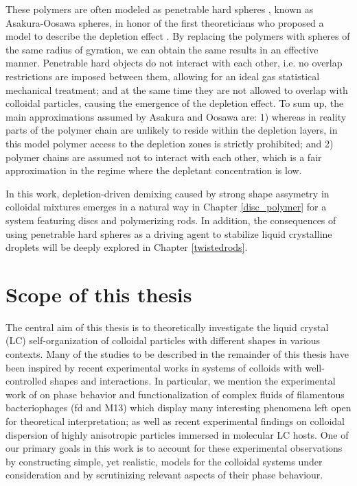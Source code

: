 These polymers are often modeled as penetrable hard spheres \cite{GARCIA201816}, known as Asakura-Oosawa spheres, in honor of the first theoreticians who proposed a model to describe the depletion effect \cite{ASAKURA54,ASAKURA58,Vrijdepletie}. By replacing the polymers with spheres of the same radius of gyration, we can obtain the same results in an effective manner. Penetrable hard objects do not interact with each other, i.e. no overlap restrictions are imposed between them, allowing for an ideal gas statistical mechanical treatment; and at the same time they are not allowed to overlap with colloidal particles, causing the emergence of the depletion effect. To sum up, the main approximations assumed by Asakura and Oosawa are: 1) whereas in reality parts of the polymer chain  are unlikely to reside within the depletion layers, in this model polymer access to the depletion zones is strictly prohibited; and 2) polymer chains are assumed not to interact with each other, which is a fair approximation in the regime where the  depletant concentration is low.

In this work, depletion-driven demixing caused by strong shape assymetry in colloidal mixtures emerges in a natural way in Chapter \ref{disc_polymer} for a system featuring discs and polymerizing rods. In addition, the consequences of using penetrable hard spheres as a driving agent to stabilize liquid crystalline droplets will be deeply explored in Chapter \ref{twistedrods}.

\section{Scope of this thesis}

The central aim of this thesis is to theoretically investigate the liquid crystal (LC) self-organization of colloidal particles with different shapes in various contexts. Many of the studies to be described in the remainder of this thesis have been inspired by recent experimental works in systems of colloids with well-controlled shapes and interactions. In particular, we mention the experimental work of \cite{Grelet2014} on phase behavior and functionalization of complex fluids of filamentous bacteriophages (fd and M13) which display many interesting phenomena left open for theoretical interpretation; as well as recent experimental findings \cite{senyuk2021nematoelasticity,mundoor2021} on colloidal dispersion of highly anisotropic particles immersed in molecular LC hosts. One of our primary goals in this work is to account for these experimental observations by constructing simple, yet realistic,  models for the colloidal systems under consideration and by scrutinizing relevant aspects of their phase behaviour.

